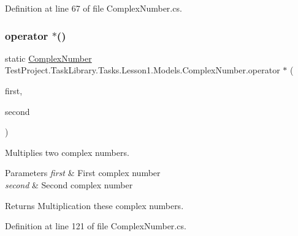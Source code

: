 Definition at line 67 of file Complex\+Number.\+cs.

\mbox{\label{class_test_project_1_1_task_library_1_1_tasks_1_1_lesson1_1_1_models_1_1_complex_number_a947f366279dbac5845394fe7b800c02b}} 
\subsubsection{\texorpdfstring{operator $\ast$()}{operator *()}}
{\footnotesize\ttfamily static \mbox{\hyperlink{class_test_project_1_1_task_library_1_1_tasks_1_1_lesson1_1_1_models_1_1_complex_number}{Complex\+Number}} Test\+Project.\+Task\+Library.\+Tasks.\+Lesson1.\+Models.\+Complex\+Number.\+operator $\ast$ (\begin{DoxyParamCaption}\item[{\mbox{\hyperlink{class_test_project_1_1_task_library_1_1_tasks_1_1_lesson1_1_1_models_1_1_complex_number}{Complex\+Number}}}]{first,  }\item[{\mbox{\hyperlink{class_test_project_1_1_task_library_1_1_tasks_1_1_lesson1_1_1_models_1_1_complex_number}{Complex\+Number}}}]{second }\end{DoxyParamCaption})\hspace{0.3cm}{\ttfamily [static]}}



Multiplies two complex numbers. 


\begin{DoxyParams}{Parameters}
{\em first} & First complex number\\
\hline
{\em second} & Second complex number\\
\hline
\end{DoxyParams}
\begin{DoxyReturn}{Returns}
Multiplication these complex numbers.
\end{DoxyReturn}


Definition at line 121 of file Complex\+Number.\+cs.

\mbox{\label{class_test_project_1_1_task_library_1_1_tasks_1_1_lesson1_1_1_models_1_1_complex_number_a02f8df187dbf1e0da228d8570ae0e42a}} 
